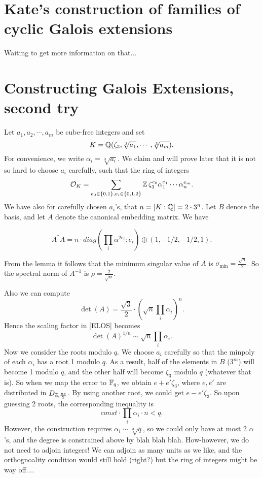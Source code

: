 \documentclass{amsart}
\begin{document}
\section{Kate's construction of families of cyclic Galois extensions}
Waiting to get more information on that...


\section{Constructing Galois Extensions, second try}


Let $a_1, a_2, \cdots, a_m$ be cube-free integers and set
\[
            K = \mathbb{Q}(\zeta_3, \sqrt[3]{a_1}, \cdots, \sqrt[3]{a_m}).
\]
For convenience, we write $\alpha_i = \sqrt[3]{a_i}$. We claim and will prove later that it is not so hard to choose $a_i$ carefully, such that the ring of integers
\[
    \mathcal{O}_K = \sum_{e_0 \in \{0,1\}, e_i \in \{0,1,2\}} \mathbb{Z} \, \zeta_3^{e_0}\alpha_1^{e_1} \cdots \alpha_n^{e_m}.
\]
We have also for carefully chosen $a_i$'s, that $n = [K: \mathbb{Q}] = 2 \cdot 3^n$. Let $B$ denote the basis, and let $A$ denote the canonical embedding matrix. We have

\begin{Lemma}
$$A^*A = n \cdot diag(\prod_i \alpha^{2e_i}: e_i) \oplus (1, -1/2, -1/2,1).$$
\end{Lemma}

From the lemma it follows that the minimum singular value of $A$ is
$\sigma_{\min} = \frac{\sqrt{n}}{2}$. So the spectral norm of $A^{-1}$ is $\rho = \frac{2}{\sqrt{n}}$.

Also we can compute
\[
    \det(A) = \frac{\sqrt{3}}{2} \cdot (\sqrt{n} \prod_i {\alpha_i})^{n}.
\]
Hence the scaling factor in [ELOS] becomes
\[
    \det(A)^{1/n} \sim \sqrt{n} \prod_i \alpha_i.
\]
Now we consider the roots modulo $q$. We choose $a_i$ carefully so that the minpoly of each $\alpha_i$ has a root 1 modulo $q$. As a result, half of the elements in $B$ ($3^m$) will become 1 modulo $q$, and the other half will become $\zeta_3$ modulo $q$ (whatever that is). So when we map the error to $\mathbb{F}_q$, we obtain $e + e'\zeta_3$, where $e, e'$ are distributed in $D_{\mathbb{Z}, \frac{ns}{2}}$. By using another root, we could get $e - e'\zeta_3$. So upon guessing 2 roots, the corresponding inequality is
\[
    const \cdot \prod_i \alpha_i \cdot n < q.
\]
However, the construction requires $\alpha_i \sim \sqrt[3]{q}$, so we could only have at most 2 $\alpha$'s, and the degree is constrained above by blah blah blah. How-however, we do not need
to adjoin integers! We can adjoin as many units as we like, and
the orthognoality condition would still hold (right?) but the ring of integers might be way off....
\end{document}
